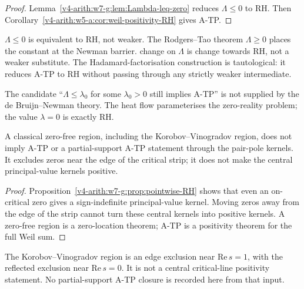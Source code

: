 \begin{proof}
Lemma~\ref{v4-arith:w7-g:lem:Lambda-leq-zero} reduces \(\Lambda\leq 0\) to
RH. Then Corollary~\ref{v4-arith:w5-a:cor:weil-positivity-RH} gives A-TP.
\end{proof}

\begin{remark}
\label{v4-arith:w7-g:rem:Lambda-not-new}
\(\Lambda\leq 0\) is equivalent to RH, not weaker. The
Rodgers--Tao theorem \(\Lambda\geq 0\) places the constant at the
Newman barrier. change
on \(\Lambda\) is change towards RH, not a weaker substitute. The
Hadamard-factorisation construction is tautological: it reduces
A-TP to RH without passing through any strictly weaker intermediate.

The candidate ``\(\Lambda\leq\lambda_{0}\) for some \(\lambda_{0}>0\)
still implies A-TP'' is not supplied by the de Bruijn--Newman theory.
The heat flow parameterises the zero-reality problem; the value
\(\lambda=0\) is exactly RH.
\end{remark}

\begin{proposition}
\label{v4-arith:w7-g:prop:weaker-condition-elementary}
A classical zero-free region, including the
Korobov--Vinogradov region, does not imply A-TP or a partial-support
A-TP statement through the pair-pole kernels. It excludes zeros near
the edge of the critical strip; it does not make the central
principal-value kernels positive.
\end{proposition}

\begin{proof}
Proposition~\ref{v4-arith:w7-g:prop:pointwise-RH} shows that even an on-critical
zero gives a sign-indefinite principal-value kernel. Moving zeros
away from the edge of the strip cannot turn these central kernels
into positive kernels. A zero-free region is a zero-location theorem;
A-TP is a positivity theorem for the full Weil sum.
\end{proof}

\begin{remark}
\label{v4-arith:w7-g:rem:zero-free-region-standard}
The Korobov--Vinogradov region is an edge exclusion near
\(\mathrm{Re}\,s=1\), with the reflected exclusion near
\(\mathrm{Re}\,s=0\). It is not a central critical-line positivity
statement. No partial-support A-TP closure is recorded here from that
input.
\end{remark}

